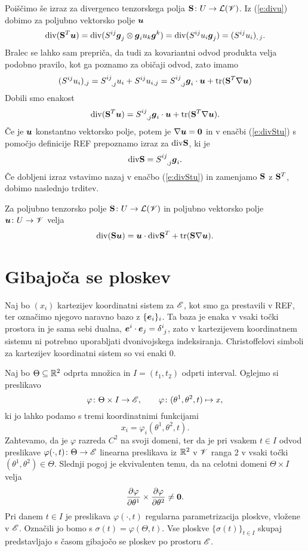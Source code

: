 Poiščimo še izraz za divergenco tenzorskega polja $\mathbf S\colon U\to\mathcal L(\mathscr V)$.
Iz (\ref{e:divu}) dobimo za poljubno vektorsko polje $\boldsymbol u$
\[
	\mathrm{div}(\mathbf S^{T}\boldsymbol u)=\mathrm{div}(S^{ij}\boldsymbol g_j\otimes\boldsymbol g_i u_k\boldsymbol g^k)
	=\mathrm{div}(S^{ij}u_i\boldsymbol g_j)=(S^{ij}u_i)_{,\,j}.
\]
Bralec se lahko sam prepriča, da tudi za kovariantni odvod produkta velja
podobno pravilo, kot ga poznamo za običaji odvod, zato imamo
\[
	(S^{ij}u_i)_{,j}=\topbot{S}{ij}{,j}u_i+S^{ij}u_{i,j}=
	\topbot{S}{ij}{,j}\vek{g}_i\cdot\vek{u}+\tr(\ten{S}^{T}\nabla\vek{u})
\]
Dobili smo enakost
\begin{equation} \label{e:divStu}
	\div(\ten{S}^{T}\vek{u})=\topbot{S}{ij}{,j}\vek{g}_i\cdot\vek{u}+\tr(\ten{S}^{T}\nabla\vek{u}).
\end{equation}
Če je $\boldsymbol u$ konstantno vektorsko polje, potem je $\nabla\boldsymbol u=\mathbf 0$ in v
enačbi (\ref{e:divStu}) s pomočjo definicije REF prepoznamo izraz za $\mathrm{div}\mathbf S$, ki je
\[
	\div\ten{S}=\topbot{S}{ij}{,j}\vek{g}_i.
\]
Če dobljeni izraz vstavimo nazaj v enačbo (\ref{e:divStu}) in zamenjamo $\mathbf S$ z
$\mathbf S^{T}$, dobimo naslednjo trditev.
\begin{trditev} \label{e:divSu}
	Za poljubno tenzorsko polje $\mathbf S\colon U\to\mathcal L(\mathscr V)$ in poljubno
	vektorsko polje $\boldsymbol u\colon U\to\mathscr V$ velja
	\[ \mathrm{div}(\mathbf S\boldsymbol u)=\boldsymbol u\cdot\mathrm{div}\mathbf S^{T}+\mathrm{tr}(\mathbf S\nabla\boldsymbol u). \]
\end{trditev}


\section{Gibajoča se ploskev}


Naj bo $(x_i)$ kartezijev koordinatni sistem za $\mathscr E$, kot smo ga prestavili v REF, ter označimo
njegovo naravno bazo z $\{\boldsymbol e_i\}_i$. Ta baza je enaka v vsaki točki prostora in je sama
sebi dualna, $\vek{e}^i\cdot\vek{e}_j=\topbot{\delta}{i}{j}$, zato v kartezijevem
koordinatnem sistemu ni potrebno uporabljati dvonivojskega indeksiranja.
Christoffelovi simboli za kartezijev koordinatni sistem so vsi enaki 0.

Naj bo $\Theta\subseteq\mathbb R^2$ odprta množica in $I=(t_1,t_2)$ odprti interval.
Oglejmo si preslikavo
\begin{equation} \label{e:pargip}
	\varphi\colon\Theta\times I\to\mathscr E,\qquad \varphi\colon(\theta^1,\theta^2,t)\mapsto x,
\end{equation}
ki jo lahko podamo s tremi koordinatnimi funkcijami
\[
	x_i=\varphi_i(\theta^1,\theta^2,t).
\]
Zahtevamo, da je $\varphi$ razreda $C^2$ na svoji domeni, ter da je pri vsakem $t\in I$ 
odvod preslikave $\varphi(\cdot,t)\colon \Theta\to\mathscr E$ linearna preslikava iz $\mathbb R^2$ v $\mathscr V$ ranga 2 v vsaki
točki $(\theta^1,\theta^2)\in\Theta$. Slednji pogoj je ekvivalenten temu, da na celotni domeni
$\Theta\times I$ velja
\[ \frac{\partial\varphi}{\partial\theta^1}\times\frac{\partial\varphi}{\partial\theta^2}\neq \boldsymbol 0. \]
Pri danem $t\in I$ je preslikava $\varphi(\cdot,t)$ regularna parametrizacija ploskve,
vložene v $\mathscr E$. Označili jo bomo s $\sigma(t)=\varphi(\Theta,t)$. Vse ploskve $\{\sigma(t)\}_{t\in I}$
skupaj predstavljajo s časom gibajočo se ploskev po prostoru $\mathscr E$.

